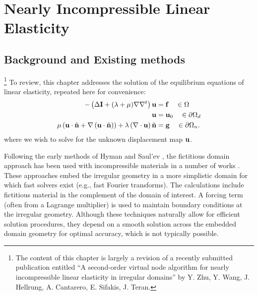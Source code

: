 %

\chapter{Nearly Incompressible Linear Elasticity} \label{ch:pt2.LE}

\section{Background and Existing methods} \label{sec:ch5.background}

\footnote{The content of this chapter is largely a revision of a recently submitted publication entitled ``A second-order virtual node
algorithm for nearly incompressible linear elasticity in irregular domains'' by Y. Zhu, Y. Wang, J. Hellrung, A. Cantarero, E. Sifakis, J. Teran.}
To review, this chapter addresses the solution of the equilibrium equations of linear elasticity, repeated here for convenience:
\begin{subequations} \label{eq:ch5.LE}
\begin{align}
-\left( \Delta \mathbf{I} + (\lambda + \mu) \nabla \nabla^t \right) \mathbf{u} & = \mathbf{f} \quad \in \Omega \label{eq:ch5.LE.PDE} \\
\mathbf{u} & = \mathbf{u}_0 \quad \in \partial\Omega_d \label{eq:ch5.LE.D} \\
\mu \left( \mathbf{u} \cdot \hat{\mathbf{n}} + \nabla \left( \mathbf{u} \cdot \hat{\mathbf{n}} \right) \right) + \lambda \left( \nabla \cdot \mathbf{u} \right) \hat{\mathbf{n}} & = \mathbf{g} \quad \in \partial\Omega_n \label{eq:ch5.LE.N}.
\end{align}
\end{subequations}
where we wish to solve for the unknown displacement map $\mathbf{u}$.

Following the early methods of Hyman \cite{Hyman52} and Saul'ev \cite{Saul'ev63}, the fictitious domain approach has been used with incompressible materials in a number of works \cite{Bertrand97, Glowinski94b, Glowinski99, Glowinski01, Biros04, Parussini08, Rutka08, Parussini09, Teran09}. These approaches embed the irregular geometry in a more simplistic domain for which fast solvers exist (e.g., fast Fourier transforms). The calculations include fictitious material in the complement of the domain of interest. A forcing term (often from a Lagrange multiplier) is used to maintain boundary conditions at the irregular geometry. Although these techniques naturally allow for efficient solution procedures, they depend on a smooth solution across the embedded domain geometry for optimal accuracy, which is not typically possible.

